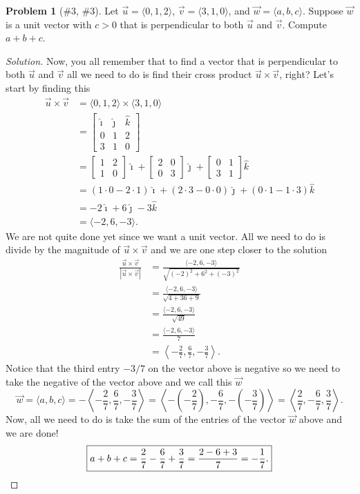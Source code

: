 \documentclass{article}
\theoremstyle{plain}
\theoremstyle{definition}
\newtheorem{problem}[exercise]{Problem}
\theoremstyle{remark}
\begin{document}
\begin{problem}[{\color{Green}\#3}, {\color{Red}\#3}]
Let $\vec u=\langle 0,1,2\rangle$, $\vec v=\langle 3,1,0\rangle$, and $\vec
w=\langle a,b,c\rangle$. Suppose $\vec w$ is a unit vector with $c>0$ that
is perpendicular to both $\vec u$ and $\vec v$. Compute $a+b+c$.
\end{problem}
\begin{proof}[Solution]
Now, you all remember that to find a vector that is perpendicular to both
$\vec u$ and $\vec v$ all we need to do is find their cross product $\vec
u\times \vec v$, right? Let's start by finding this
\begingroup
\allowdisplaybreaks
\begin{align*}
\vec u\times\vec v
&=\langle 0,1,2\rangle\times\langle 3,1,0\rangle\\
&=\begin{bmatrix}
\hat\imath&\hat\jmath&\hat k\\
0&1&2\\
3&1&0
\end{bmatrix}\\
&=\begin{bmatrix}
1&2\\1&0
\end{bmatrix}\hat\imath
+\begin{bmatrix}
2&0\\
0&3
\end{bmatrix}\hat\jmath
+\begin{bmatrix}
0&1\\
3&1
\end{bmatrix}\hat k\\
&=(1\cdot 0-2\cdot 1)\hat\imath+(2\cdot 3-0\cdot 0)\hat\jmath+(0\cdot
  1-1\cdot 3)\hat k\\
&=-2\hat\imath+6\hat\jmath-3\hat k\\
&=\langle -2,6,-3\rangle.
\end{align*}
\endgroup
We are not quite done yet since we want a unit vector. All we need to do is
divide by the magnitude of $\vec u\times\vec v$ and we are one step closer
to the solution
\begingroup
\allowdisplaybreaks
\begin{align*}
\frac{\vec u\times\vec v}{\left|\vec u\times\vec v\right|}
&=\frac{\langle -2,6,-3\rangle}{\sqrt{(-2)^2+6^2+(-3)^2}}\\
&=\frac{\langle -2,6,-3\rangle}{\sqrt{4+36+9}}\\
&=\frac{\langle -2,6,-3\rangle}{\sqrt{49}}\\
&=\frac{\langle -2,6,-3\rangle}{7}\\
&=\left<-\frac{2}{7},\frac{6}{7},-\frac{3}{7}\right>.
\end{align*}
\endgroup
Notice that the third entry $-3/7$ on the vector above is negative so we
need to take the negative of the vector above and we call this $\vec w$
\[
\vec w
=\langle a,b,c\rangle=-\left<-\frac{2}{7},\frac{6}{7},-\frac{3}{7}\right>
=\left<-\left(-\frac{2}{7}\right),-\frac{6}{7},-\left(-\frac{3}{7}\right)\right>
=\left<\frac{2}{7},-\frac{6}{7},\frac{3}{7}\right>.
\]
Now, all we need to do is take the sum of the entries of the vector
$\vec w$ above and we are done!
\[
\boxed{a+b+c=\frac{2}{7}-\frac{6}{7}+\frac{3}{7}=
\frac{2-6+3}{7}=
-\frac{1}{7}.}\qedhere
\]
\end{proof}
\end{document}
